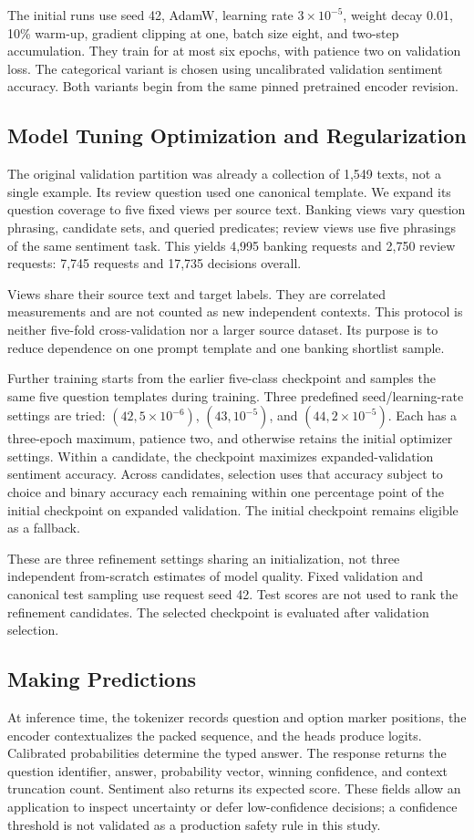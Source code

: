 \documentclass[conference]{IEEEtran}
\begin{document}
The initial runs use seed 42, AdamW, learning rate $3\times10^{-5}$, weight decay 0.01, 10\% warm-up, gradient clipping at one, batch size eight, and two-step accumulation. They train for at most six epochs, with patience two on validation loss. The categorical variant is chosen using uncalibrated validation sentiment accuracy. Both variants begin from the same pinned pretrained encoder revision.

\subsection{Model Tuning Optimization and Regularization}
The original validation partition was already a collection of 1,549 texts, not a single example. Its review question used one canonical template. We expand its question coverage to five fixed views per source text. Banking views vary question phrasing, candidate sets, and queried predicates; review views use five phrasings of the same sentiment task. This yields 4,995 banking requests and 2,750 review requests: 7,745 requests and 17,735 decisions overall.

Views share their source text and target labels. They are correlated measurements and are not counted as new independent contexts. This protocol is neither five-fold cross-validation nor a larger source dataset. Its purpose is to reduce dependence on one prompt template and one banking shortlist sample.

Further training starts from the earlier five-class checkpoint and samples the same five question templates during training. Three predefined seed/learning-rate settings are tried: $(42,5\times10^{-6})$, $(43,10^{-5})$, and $(44,2\times10^{-5})$. Each has a three-epoch maximum, patience two, and otherwise retains the initial optimizer settings. Within a candidate, the checkpoint maximizes expanded-validation sentiment accuracy. Across candidates, selection uses that accuracy subject to choice and binary accuracy each remaining within one percentage point of the initial checkpoint on expanded validation. The initial checkpoint remains eligible as a fallback.

These are three refinement settings sharing an initialization, not three independent from-scratch estimates of model quality. Fixed validation and canonical test sampling use request seed 42. Test scores are not used to rank the refinement candidates. The selected checkpoint is evaluated after validation selection.


\subsection{Making Predictions}
At inference time, the tokenizer records question and option marker positions, the encoder contextualizes the packed sequence, and the heads produce logits. Calibrated probabilities determine the typed answer. The response returns the question identifier, answer, probability vector, winning confidence, and context truncation count. Sentiment also returns its expected score. These fields allow an application to inspect uncertainty or defer low-confidence decisions; a confidence threshold is not validated as a production safety rule in this study.
\end{document}
